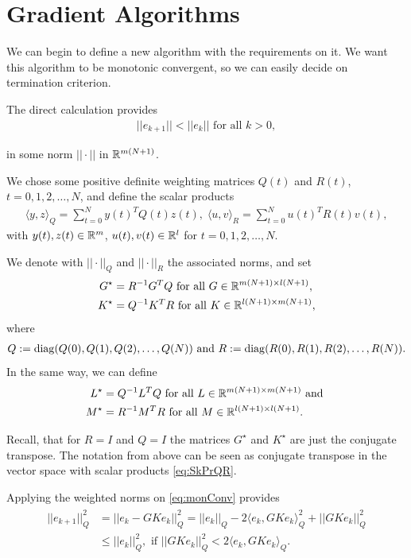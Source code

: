 	 \section{Gradient Algorithms}
We can begin to define a new algorithm with the requirements on it. We want this algorithm to be monotonic convergent, so we can easily decide on termination criterion. 

The direct calculation provides 
\begin{align}
\label{eq:monConv}
||e_{k+1}|| < ||e_k|| \text{ for all } k >0,
\end{align}

in some norm $|| \cdot || $ in ${\mathbb{R}}^{m(N+1)}$. 

We chose some positive definite weighting matrices $Q(t)$ and $R(t)$, $t = 0, 1, 2, \dots ,N$, and define the scalar products
\begin{align}
\label{eq:SkPrQR}
\langle y,z\rangle_Q = \sum_{t = 0}^N y(t)^TQ(t)z(t), \; \langle u,v\rangle_R = \sum_{t = 0}^N u(t)^T R(t) v(t),
\end{align}
with $y(t), z(t) \in {\mathbb{R}}^{m}$, $u(t), v(t) \in {\mathbb{R}}^l$ for $t = 0,1,2, \dots, N$. 

We denote with $||\cdot||_Q$ and $||\cdot||_R$ the associated norms, and set
\begin{align*}
G^\star &= R^{-1} G^T Q \text{ for all } G \in {\mathbb{R}}^{m(N+1)\times l(N+1)},\\
K^\star &= Q^{-1} K^T R \text{ for all } K \in {\mathbb{R}}^{l(N+1)\times m(N+1)},
\end{align*}
where 
\begin{align}
Q := \operatorname*{diag}(Q(0), Q(1), Q(2) ,\dots, Q(N)) \text{ and } R:= \operatorname*{diag}(R(0), R(1), R(2), \dots, R(N)).
\end{align}
In the same way, we can define 
\begin{align}
L^\star &= Q^{-1} L^T Q \text{ for all } L \in {\mathbb{R}}^{m(N+1)\times m(N+1)} \text{ and }\\
M^\star &= R^{-1} M^T R \text{ for all } M \in {\mathbb{R}}^{l(N+1)\times l(N+1)}.
\end{align}

Recall, that for $R = I$ and $Q = I$ the matrices $G^\star$ and $K^\star$ are just the conjugate transpose. The notation from above can be seen as conjugate transpose in the vector space with scalar products \eqref{eq:SkPrQR}.

Applying the weighted norms on \eqref{eq:monConv} provides
\begin{align}
\begin{split}
||e_{k+1} ||_Q^2 &= ||e_k - G K e_k||_Q^2 = ||e_k||_Q - 2\langle e_k , G K e_k \rangle_Q^2 + ||G K e_k||_Q^2 \\ 
&\leq ||e_k||_Q^2, \text{ if } ||GK e_k||_Q^2 < 2 \langle e_k, GK e_k\rangle_Q. 
\end{split}
\end{align}

